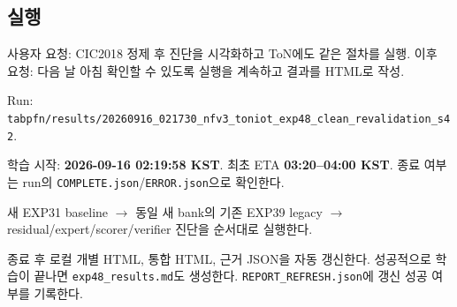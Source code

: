 \subsection{실행}
\par\noindent \textbullet\enspace 사용자 요청: CIC2018 정제 후 진단을 시각화하고 ToN에도 같은 절차를 실행. 이후 요청: 다음 날 아침 확인할 수 있도록 실행을 계속하고 결과를 HTML로 작성.


\par\noindent \textbullet\enspace Run: \texttt{tabpfn/\allowbreak{}\allowbreak{}r\allowbreak{}esults/\allowbreak{}\allowbreak{}2\allowbreak{}0260916\_\allowbreak{}\allowbreak{}021730\_\allowbreak{}\allowbreak{}n\allowbreak{}fv3\_\allowbreak{}\allowbreak{}toni\allowbreak{}ot\_\allowbreak{}\allowbreak{}exp48\allowbreak{}\_\allowbreak{}\allowbreak{}clean\_\allowbreak{}\allowbreak{}r\allowbreak{}evalidat\allowbreak{}ion\_\allowbreak{}\allowbreak{}s42}.


\par\noindent \textbullet\enspace 학습 시작: \textbf{2026-09-16 02:19:58 KST}. 최초 ETA \textbf{03:20–04:00 KST}. 종료 여부는 run의 \texttt{COMPLETE\allowbreak{}.\allowbreak{}json}/\allowbreak{}\texttt{ERROR.\allowbreak{}js\allowbreak{}on}으로 확인한다.


\par\noindent \textbullet\enspace 새 EXP31 baseline  \ensuremath{\rightarrow}  동일 새 bank의 기존 EXP39 legacy  \ensuremath{\rightarrow}  residual/\allowbreak{}expert/\allowbreak{}scorer/\allowbreak{}verifier 진단을 순서대로 실행한다.


\par\noindent \textbullet\enspace 종료 후 로컬 개별 HTML, 통합 HTML, 근거 JSON을 자동 갱신한다. 성공적으로 학습이 끝나면 \texttt{exp48\_\allowbreak{}\allowbreak{}re\allowbreak{}sults.\allowbreak{}md\allowbreak{}}도 생성한다. \texttt{REPORT\_\allowbreak{}\allowbreak{}R\allowbreak{}EFRESH.\allowbreak{}j\allowbreak{}son}에 갱신 성공 여부를 기록한다.


